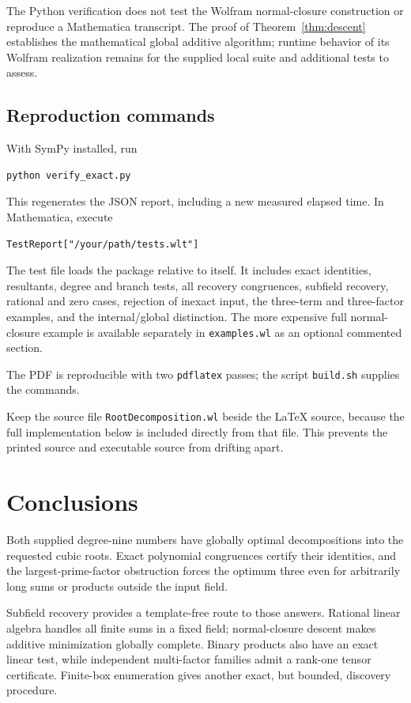 \documentclass[11pt,letterpaper]{article}
\theoremstyle{definition}
\theoremstyle{remark}
\newcommand{\wl}[1]{\texttt{#1}}
\begin{document}
The Python verification does not test the Wolfram normal-closure
construction or reproduce a Mathematica transcript. The proof of
Theorem~\ref{thm:descent} establishes the mathematical global additive
algorithm; runtime behavior of its Wolfram realization remains for the
supplied local suite and additional tests to assess.

\subsection{Reproduction commands}
With SymPy installed, run
\begin{lstlisting}[language={}]
python verify_exact.py
\end{lstlisting}
This regenerates the JSON report, including a new measured elapsed time.
In Mathematica, execute
\begin{lstlisting}
TestReport["/your/path/tests.wlt"]
\end{lstlisting}
The test file loads the package relative to itself. It includes exact
identities, resultants, degree and branch tests, all recovery congruences,
subfield recovery, rational and zero cases, rejection of inexact input, the
three-term and three-factor examples, and the internal/global distinction.
The more expensive full normal-closure example is available separately in
\wl{examples.wl} as an optional commented section.

The PDF is reproducible with two \wl{pdflatex} passes; the script
\wl{build.sh} supplies the commands.

Keep the source file \wl{RootDecomposition.wl} beside the \LaTeX{}
source, because the full implementation below is included directly from
that file. This prevents the printed source and executable source from
drifting apart.

\section{Conclusions}
Both supplied degree-nine numbers have globally optimal decompositions
into the requested cubic roots. Exact polynomial congruences certify their
identities, and the largest-prime-factor obstruction forces the optimum
three even for arbitrarily long sums or products outside the input field.

Subfield recovery provides a template-free route to those answers. Rational
linear algebra handles all finite sums in a fixed field; normal-closure
descent makes additive minimization globally complete. Binary products also
have an exact linear test, while independent multi-factor families admit a
rank-one tensor certificate. Finite-box enumeration gives another exact,
but bounded, discovery procedure.
\end{document}
